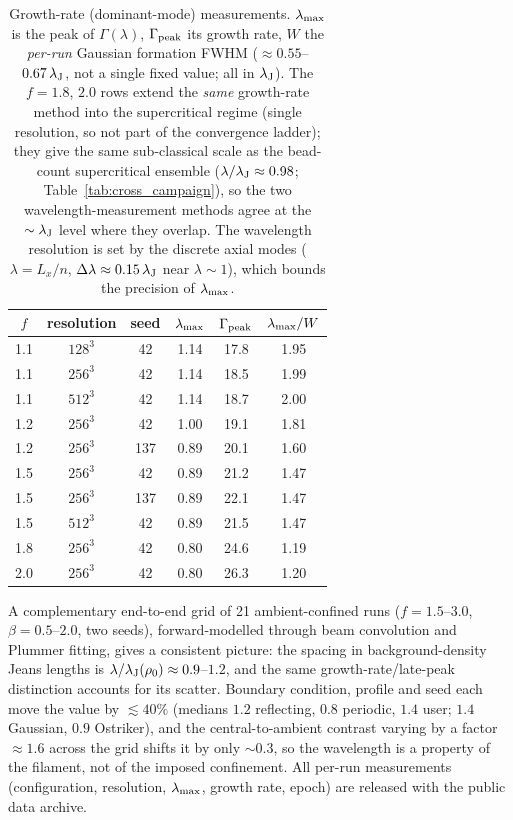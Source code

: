 \documentclass[usenatbib,twoside,twocolumn]{mnras}
\begin{document}
\begin{table}
\caption{Growth-rate (dominant-mode) measurements. $\lambda_{\rm max}$ is the peak of $\Gamma(\lambda)$, $\Gamma_{\rm peak}$ its growth rate, $W$ the \emph{per-run} Gaussian formation FWHM ($\approx0.55$--$0.67\,\lambda_{\rm J}$, not a single fixed value; all in $\lambda_{\rm J}$). The $f=1.8$, $2.0$ rows extend the \emph{same} growth-rate method into the supercritical regime (single resolution, so not part of the convergence ladder); they give the same sub-classical scale as the bead-count supercritical ensemble ($\lambda/\lambda_{\rm J}\approx0.98$; Table~\ref{tab:cross_campaign}), so the two wavelength-measurement methods agree at the $\sim\lambda_{\rm J}$ level where they overlap. The wavelength resolution is set by the discrete axial modes ($\lambda=L_x/n$, $\Delta\lambda\approx0.15\,\lambda_{\rm J}$ near $\lambda\sim1$), which bounds the precision of $\lambda_{\rm max}$.}
\label{tab:wave}
\footnotesize
\setlength{\tabcolsep}{4pt}
\begin{tabular}{cccccc}
\toprule
$f$ & resolution & seed & $\lambda_{\rm max}$ & $\Gamma_{\rm peak}$ & $\lambda_{\rm max}/W$ \\
\midrule
1.1 & $128^3$ & 42  & 1.14 & 17.8 & 1.95 \\
1.1 & $256^3$ & 42  & 1.14 & 18.5 & 1.99 \\
1.1 & $512^3$ & 42  & 1.14 & 18.7 & 2.00 \\
1.2 & $256^3$ & 42  & 1.00 & 19.1 & 1.81 \\
1.2 & $256^3$ & 137 & 0.89 & 20.1 & 1.60 \\
1.5 & $256^3$ & 42  & 0.89 & 21.2 & 1.47 \\
1.5 & $256^3$ & 137 & 0.89 & 22.1 & 1.47 \\
1.5 & $512^3$ & 42  & 0.89 & 21.5 & 1.47 \\
1.8 & $256^3$ & 42  & 0.80 & 24.6 & 1.19 \\
2.0 & $256^3$ & 42  & 0.80 & 26.3 & 1.20 \\
\bottomrule
\end{tabular}
\end{table}

A complementary end-to-end grid of 21 ambient-confined runs ($f=1.5$--$3.0$, $\beta=0.5$--$2.0$, two seeds), forward-modelled through beam convolution and Plummer fitting, gives a consistent picture: the spacing in background-density Jeans lengths is $\lambda/\lambda_{\rm J}(\rho_0)\approx0.9$--$1.2$, and the same growth-rate/late-peak distinction accounts for its scatter. Boundary condition, profile and seed each move the value by $\lesssim40\%$ (medians $1.2$ reflecting, $0.8$ periodic, $1.4$ user; $1.4$ Gaussian, $0.9$ Ostriker), and the central-to-ambient contrast varying by a factor $\approx1.6$ across the grid shifts it by only $\sim0.3$, so the wavelength is a property of the filament, not of the imposed confinement. All per-run measurements (configuration, resolution, $\lambda_{\rm max}$, growth rate, epoch) are released with the public data archive.
\end{document}
